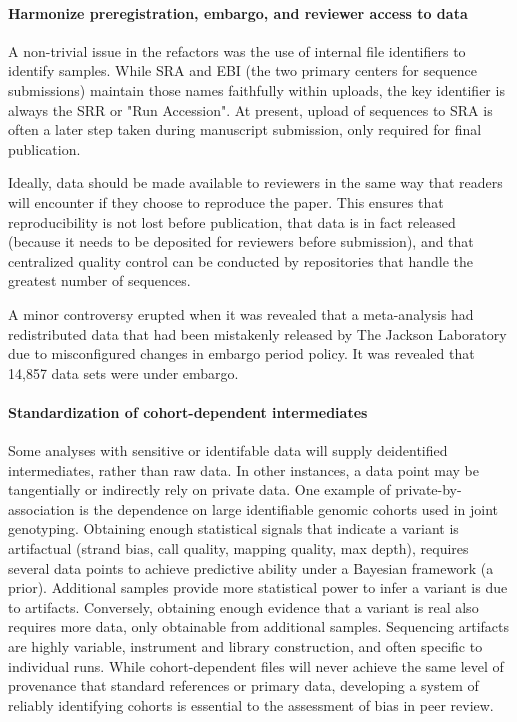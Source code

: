 \documentclass{drexelthesis}
\begin{document}
\paragraph{Harmonize preregistration, embargo, and reviewer access to data}

A non-trivial issue in the refactors was the use of internal file identifiers to identify samples. While SRA and EBI (the two primary centers for sequence submissions) maintain those names faithfully within uploads, the key identifier is always the SRR or "Run Accession". At present, upload of sequences to SRA is often a later step taken during manuscript submission, only required for final publication.

Ideally, data should be made available to reviewers in the same way that readers will encounter if they choose to reproduce the paper. This ensures that reproducibility is not lost before publication, that data is in fact released (because it needs to be deposited for reviewers before submission), and that centralized quality control can be conducted by repositories that handle the greatest number of sequences.

A minor controversy erupted when it was revealed that a meta-analysis \cite{Edgar2021-lv} had redistributed data that had been mistakenly released by The Jackson Laboratory due to misconfigured changes in embargo period policy. It was revealed that 14,857 data sets were under embargo.

\paragraph{Standardization of cohort-dependent intermediates}

Some analyses with sensitive or identifable data will supply deidentified intermediates, rather than raw data. In other instances, a data point may be tangentially or indirectly rely on private data. One example of private-by-association is the dependence on large identifiable genomic cohorts used in joint genotyping. Obtaining enough statistical signals that indicate a variant is artifactual (strand bias, call quality, mapping quality, max depth), requires several data points to achieve predictive ability under a Bayesian framework (a prior). Additional samples provide more statistical power to infer a variant is due to artifacts. Conversely, obtaining enough evidence that a variant is real also requires more data, only obtainable from additional samples. Sequencing artifacts are highly variable, instrument and library construction, and often specific to individual runs. While cohort-dependent files will never achieve the same level of provenance that standard references or primary data, developing a system of reliably identifying cohorts is essential to the assessment of bias in peer review.
\end{document}
